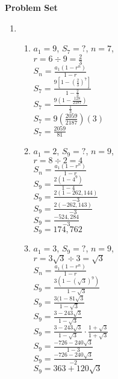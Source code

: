 \textbf{Problem Set }

\vspce

\begin{enumerate}[label = \Alph*. ]

\item \phantom{n}  %
  
\begin{enumerate}[label = \arabic*. ]

	\item %
$a_1=9$, $S_{7}=? $, $n=7$,\\
$r=6 \div 9=\displaystyle \frac{2}{3} $\\
$\displaystyle S_{n} = \frac{a_1(1-r^n)}{1-r}$\\
$\displaystyle S_{7} = \frac{9\left[ 1-\left(  \frac{2}{3}\right)^7\right] }{1- \frac{2}{3} }$\\
$\displaystyle S_{7} = \frac{9\left( 1- \frac{128}{2187} \right) }{ \frac{1}{3} }$\\
$\displaystyle S_{7} = 9\left(  \frac{2059}{2187} \right)(3)$\\
$\displaystyle S_{7} = \displaystyle \frac{2059}{81} $

	\item %
	$a_1=2$, $S_{9}=?$, $n=9$,\\
$r=8 \div 2=4 $\\
$\displaystyle S_{n} = \frac{a_1(1-r^n)}{1-r}$\\
$\displaystyle S_{9} = \frac{2(1-4^9)}{1-4}$\\
$\displaystyle S_{9} = \frac{2(1-262,144)}{-3}$\\
$\displaystyle S_{9} = \frac{2(-262,143)}{-3}$\\
$\displaystyle S_{9} = \frac{-524,284}{-3}$\\
$S_{9} =174,762$

	\item%
		$a_1=3$, $S_{9}=?$, $n=9$,\\
$r=3\sqrt{3} \div 3= \sqrt{3}$\\
$\displaystyle S_{n} = \frac{a_1(1-r^n)}{1-r}$\\
$\displaystyle S_{9} = \frac{3(1-(\sqrt{3})^9)}{1-\sqrt{3}}$\\
$\displaystyle S_{9} = \frac{3(1-81\sqrt{3}}{1-\sqrt{3}}$\\
$\displaystyle S_{9} = \frac{3-243\sqrt{3}}{1-\sqrt{3}}$\\
$\displaystyle S_{9} = \frac{3-243\sqrt{3}}{1-\sqrt{3}}\cdot \displaystyle \frac{1+\sqrt{3}}{1+\sqrt{3}} $\\
$\displaystyle S_{9} = \frac{-726-240 \sqrt{3}}{1-3} $\\
$\displaystyle S_{9} = \frac{-726-240 \sqrt{3}}{-2} $\\
$\displaystyle S_{9} = 363+120 \sqrt{3} $\\


\end{enumerate}
\end{enumerate}
